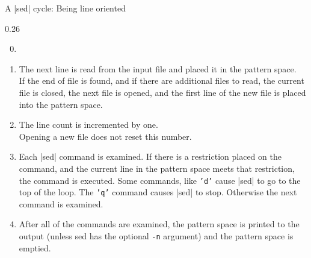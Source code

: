 \begin{frame}{A \bash|sed| cycle: Being line oriented}
    \begin{overlayarea}{\textwidth}{0.26\textheight}
        \begin{enumerate}
            \setcounter{enumi}{-1}
            \item<only@0> %
            \item<only@2> The next line is read from the input file and placed it in the pattern space.\\
                          If the end of file is found, and if there are additional files to read, the current file is closed, the next file is opened, and the first line of the new file is placed into the pattern space.
            \item<only@3> The line count is incremented by one.\\
                          Opening a new file does not reset this number.
            \item<only@4> Each \bash|sed| command is examined.
                          If there is a restriction placed on the command, and the current line in the pattern space meets that restriction, the command is executed.
                          Some commands, like \texttt{'d'} cause \bash|sed| to go to the top of the loop.
                          The \texttt{'q'} command causes \bash|sed| to stop.
                          Otherwise the next command is examined.
            \item<only@5> After all of the commands are examined, the pattern space is printed to the output (unless sed has the optional \texttt{-n} argument) and the pattern space is emptied.
        \end{enumerate}%
    \end{overlayarea}
    \begin{center}
\end{center}
\end{frame}
